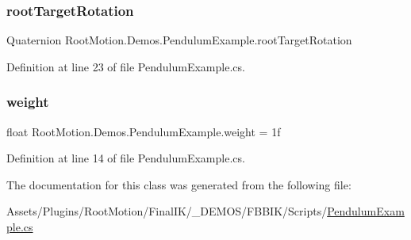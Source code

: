 \subsubsection{\texorpdfstring{root\+Target\+Rotation}{rootTargetRotation}}
{\footnotesize\ttfamily Quaternion Root\+Motion.\+Demos.\+Pendulum\+Example.\+root\+Target\+Rotation}



Definition at line 23 of file Pendulum\+Example.\+cs.

\mbox{\label{class_root_motion_1_1_demos_1_1_pendulum_example_ac6c90130723c1e95b19a8c946d5c950c}} 
\subsubsection{\texorpdfstring{weight}{weight}}
{\footnotesize\ttfamily float Root\+Motion.\+Demos.\+Pendulum\+Example.\+weight = 1f}



Definition at line 14 of file Pendulum\+Example.\+cs.



The documentation for this class was generated from the following file\+:\begin{DoxyCompactItemize}
\item 
Assets/\+Plugins/\+Root\+Motion/\+Final\+I\+K/\+\_\+\+D\+E\+M\+O\+S/\+F\+B\+B\+I\+K/\+Scripts/\mbox{\hyperlink{_pendulum_example_8cs}{Pendulum\+Example.\+cs}}\end{DoxyCompactItemize}
